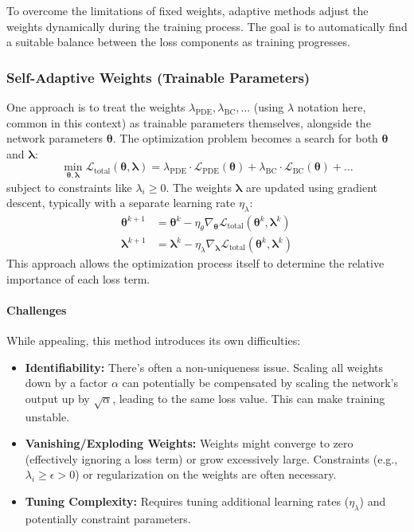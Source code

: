 To overcome the limitations of fixed weights, adaptive methods adjust the weights dynamically during the training process. The goal is to automatically find a suitable balance between the loss components as training progresses.

\subsubsection{Self-Adaptive Weights (Trainable Parameters)}

One approach is to treat the weights $\lambda_{\text{PDE}}, \lambda_{\text{BC}}, \dots$ (using $\lambda$ notation here, common in this context) as trainable parameters themselves, alongside the network parameters $\boldsymbol{\theta}$. The optimization problem becomes a search for both $\boldsymbol{\theta}$ and $\boldsymbol{\lambda}$:
%
\begin{equation*} 
\min_{\boldsymbol{\theta}, \boldsymbol{\lambda}} \mathcal{L}_{\text{total}}(\boldsymbol{\theta}, \boldsymbol{\lambda}) = \lambda_{\text{PDE}}\cdot \mathcal{L}_{\text{PDE}}(\boldsymbol{\theta}) + \lambda_{\text{BC}} \cdot \mathcal{L}_{\text{BC}}(\boldsymbol{\theta}) + \dots 
\end{equation*} 
%
subject to constraints like $\lambda_i \geq 0$. The weights $\boldsymbol{\lambda}$ are updated using gradient descent, typically with a separate learning rate $\eta_\lambda$:
%
\begin{align*} 
\boldsymbol{\theta}^{k+1} &= \boldsymbol{\theta}^k - \eta_\theta \nabla_{\boldsymbol{\theta}} \mathcal{L}_{\text{total}}(\boldsymbol{\theta}^k, \boldsymbol{\lambda}^k) \\
\boldsymbol{\lambda}^{k+1} &= \boldsymbol{\lambda}^k - \eta_\lambda \nabla_{\boldsymbol{\lambda}} \mathcal{L}_{\text{total}}(\boldsymbol{\theta}^k, \boldsymbol{\lambda}^k) 
\end{align*} 
%
This approach allows the optimization process itself to determine the relative importance of each loss term.

\paragraph{Challenges}
While appealing, this method introduces its own difficulties:
\begin{itemize}
    \item \textbf{Identifiability:} There's often a non-uniqueness issue. Scaling all weights down by a factor $\alpha$ can potentially be compensated by scaling the network's output up by $\sqrt{\alpha}$, leading to the same loss value. This can make training unstable.
    \item \textbf{Vanishing/Exploding Weights:} Weights might converge to zero (effectively ignoring a loss term) or grow excessively large. Constraints (e.g., $\lambda_i \ge \epsilon > 0$) or regularization on the weights are often necessary.
    \item \textbf{Tuning Complexity:} Requires tuning additional learning rates ($\eta_\lambda$) and potentially constraint parameters.
\end{itemize}

